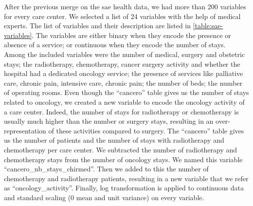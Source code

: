 After the previous merge on the \ac{sae} health data, we had more than 200
variables for every care center. We selected a list of 24 variables with the
help of medical experts. The list of variables and their description are listed
in \cref{table:sae-variables}. The variables are either binary when they encode
the presence or absence of a service; or continuous when they encode the number
of stays. Among the included variables were the number of medical, surgery and
obstetric stays; the radiotherapy, chemotherapy, cancer surgery activity and
whether the hospital had a dedicated oncology service; the presence of services
like palliative care, chronic pain, intensive care, chronic pain; the number of
beds; the number of operating rooms. Even though the ``cancero'' table gives us
the number of stays related to oncology, we created a new variable to encode the
oncology activity of a care center. Indeed, the number of stays for radiotherapy
or chemotherapy is usually much higher than the number or surgery stays,
resulting in an over-representation of these activities compared to surgery. The
``cancero'' table gives us the number of patients and the number of stays with
radiotherapy and chemotherapy per care center. We subtracted the number of
radiotherapy and chemotherapy stays from the number of oncology stays. We named
this variable ``cancero\_nb\_stays\_chirmed''. Then we added to this the number
of chemotherapy and radiotherapy patients, resulting in a new variable that we
refer as ``oncology\_activity''. Finally, log transformation is applied to
continuous data and standard scaling (0 mean and unit variance) on every
variable.

